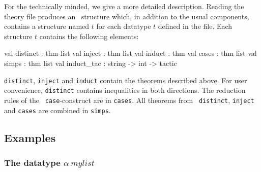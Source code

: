 For the technically minded, we give a more detailed description.
Reading the theory file produces an \ML\ structure which, in addition to the
usual components, contains a structure named $t$ for each datatype $t$
defined in the file.  Each structure $t$ contains the following
elements:
\begin{ttbox}
val distinct : thm list
val inject : thm list
val induct : thm
val cases : thm list
val simps : thm list
val induct_tac : string -> int -> tactic
\end{ttbox}
{\tt distinct}, \texttt{inject} and \texttt{induct} contain the theorems
described above.  For user convenience, \texttt{distinct} contains
inequalities in both directions.  The reduction rules of the {\tt
  case}-construct are in \texttt{cases}.  All theorems from {\tt
  distinct}, \texttt{inject} and \texttt{cases} are combined in \texttt{simps}.

\subsection{Examples}

\subsubsection{The datatype $\alpha~mylist$}

